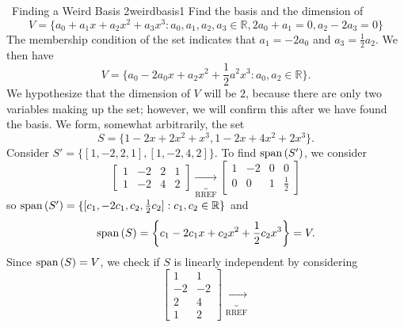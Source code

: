 \begin{example}{\Difficulty\,\Difficulty\,\,Finding a Weird Basis 2}{weirdbasis1}
            Find the basis and the dimension of 
            \begin{equation*}
                V=\{a_0+a_1x+a_2x^2+a_3x^3:a_0,a_1,a_2,a_3\in\mathbb{R},2a_0+a_1=0,a_2-2a_3=0\}
            \end{equation*}
            The membership condition of the set indicates that \(a_1=-2a_0\) and \(a_3=\frac{1}{2}a_2\). We then have
            \begin{equation*}
                V=\{a_0-2a_0x+a_2x^2+\frac{1}{2}a^2x^3:a_0,a_2\in\mathbb{R}\}.
            \end{equation*}
            We hypothesize that the dimension of \(V\) will be \(2\), because there are only two variables making up the set; however, we will confirm this after we have found the basis. We form, somewhat arbitrarily, the set
            \begin{equation*}
                S=\{1-2x+2x^2+x^3,1-2x+4x^2+2x^3\}.
            \end{equation*}
            Consider \(S'=\{[1,-2,2,1],[1,-2,4,2]\}\). To find \(\text{span\,}(S')\), we consider
            \begin{equation*}
                \begin{bmatrix}
                    1 & -2 & 2 & 1 \\
                    1 & -2 & 4 & 2
                \end{bmatrix}\underbrace{\to}_{\text{RREF}}
                \begin{bmatrix}
                    1 & -2 & 0 & 0 \\
                    0 & 0 & 1 & \frac{1}{2}
                \end{bmatrix}
            \end{equation*} 
            so \(\text{span\,}(S')=\{[c_1,-2c_1,c_2,\frac{1}{2}c_2]:c_1,c_2\in\mathbb{R}\}\) and 
            \begin{equation*}
                \text{span\,}(S)=\left\{c_1-2c_1x+c_2x^2+\frac{1}{2}c_2x^3\right\}=V.
            \end{equation*}
            Since \(\text{span\,}(S)=V\), we check if \(S\) is linearly independent by considering
            \begin{equation*}
                \begin{bmatrix}
                    1 & 1 \\
                    -2 & -2 \\
                    2 & 4 \\
                    1 & 2
                \end{bmatrix}\underbrace{\to}_{\text{RREF}}

\end{equation*}
\end{example}
